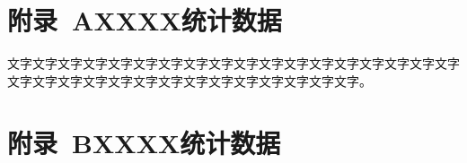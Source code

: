 












\newpage



\section*{附录~A\quad XXXX统计数据}

文字文字文字文字文字文字文字文字文字文字文字文字文字文字文字文字文字文字文字文字文字文字文字文字文字文字文字文字文字文字文字文字。

\newpage

\section*{附录~B\quad XXXX统计数据}

